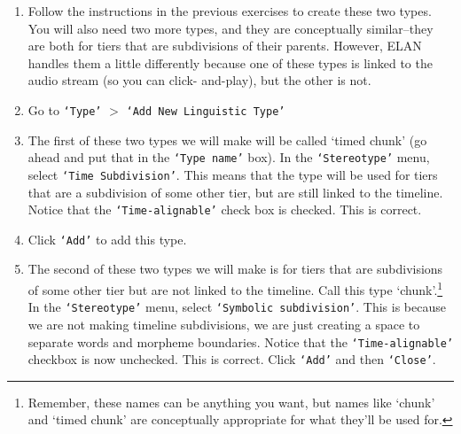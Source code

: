 \documentclass[letterpaper,12pt]{article}
\begin{document}
\begin{enumerate}
\item Follow the instructions in the previous exercises to create these two types.
You will also need two more types, and they are conceptually similar--they are both for tiers that are subdivisions of their parents. However, ELAN handles them a little differently because one of these types is linked to the audio stream (so you can click- and-play), but the other is not.
\item Go to \texttt{`Type'} $>$ \texttt{`Add New Linguistic Type'}
\item The first of these two types we will make will be called `timed chunk' (go ahead and put that in the \texttt{`Type name'} box). In the \texttt{`Stereotype'} menu, select \texttt{`Time Subdivision'}. This means that the type will be used for tiers that are a subdivision of some other tier, but are still linked to the timeline. Notice that the \texttt{`Time-alignable'} check box is checked. This is correct.
\item Click \texttt{`Add'} to add this type.
\item The second of these two types we will make is for tiers that are subdivisions of some other tier but are not linked to the timeline. Call this type `chunk'.\footnote{Remember, these names can be anything you want, but names like `chunk' and `timed chunk' are conceptually appropriate for what they'll be used for.} In the \texttt{`Stereotype'} menu, select \texttt{`Symbolic subdivision'}. This is because we are not making timeline subdivisions, we are just creating a space to separate words and morpheme boundaries. Notice that the \texttt{`Time-alignable'} checkbox is now unchecked. This is correct. Click \texttt{`Add'} and then \texttt{`Close'}.
\end{enumerate}
\end{document}

